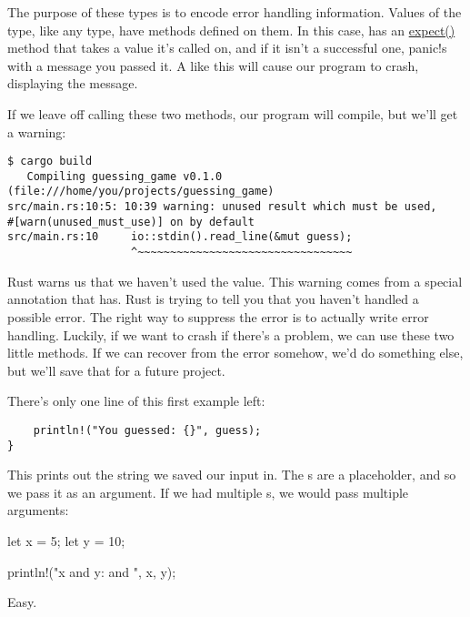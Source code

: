 \blank

The purpose of these  types is to encode error handling information. Values of the  type, like any 
type, have methods defined on them. In this case,  has an 
\href{https://doc.rust-lang.org/std/option/enum.Option.html\#method.expect}{expect()} method that takes a value it's called on, 
and if it isn't a successful one, panic!s with a message you passed it. A  like this will cause our program to crash,
displaying the message.

\blank

If we leave off calling these two methods, our program will compile, but we'll get a warning:

\begin{verbatim}
$ cargo build
   Compiling guessing_game v0.1.0 (file:///home/you/projects/guessing_game)
src/main.rs:10:5: 10:39 warning: unused result which must be used,
#[warn(unused_must_use)] on by default
src/main.rs:10     io::stdin().read_line(&mut guess);
                   ^~~~~~~~~~~~~~~~~~~~~~~~~~~~~~~~~~
\end{verbatim}

Rust warns us that we haven't used the  value. This warning comes from a special annotation that 
 has. Rust is trying to tell you that you haven't handled a possible error. The right way to suppress 
the error is to actually write error handling. Luckily, if we want to crash if there's a problem, we can use these two 
little methods. If we can recover from the error somehow, we'd do something else, but we'll save that for a future project.

\blank

There's only one line of this first example left:

\begin{verbatim}
    println!("You guessed: {}", guess);
} 
\end{verbatim}

This prints out the string we saved our input in. The \code{\{\}}s are a placeholder, and so we pass it  as an 
argument. If we had multiple \code{\{\}}s, we would pass multiple arguments:

\begin{rustc}
let x = 5;
let y = 10;

println!("x and y: {} and {}", x, y);
\end{rustc}

Easy.

